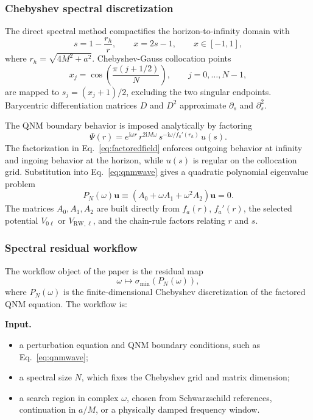 ﻿\documentclass[12pt,a4paper]{article}
\newcommand{\ii}{\mathrm{i}}
\begin{document}
\subsubsection{Chebyshev spectral discretization}

The direct spectral method compactifies the horizon-to-infinity domain with
\begin{equation*}
s=1-\frac{r_h}{r},\qquad x=2s-1,\qquad x\in[-1,1],
\end{equation*}
where \(r_h=\sqrt{4M^2+a^2}\). Chebyshev-Gauss collocation points
\begin{equation*}
x_j=\cos\left(\frac{\pi(j+1/2)}{N}\right),\qquad j=0,\ldots,N-1,
\end{equation*}
are mapped to \(s_j=(x_j+1)/2\), excluding the two singular endpoints. Barycentric differentiation matrices \(D\) and \(D^2\) approximate \(\partial_s\) and \(\partial_s^2\).

The QNM boundary behavior is imposed analytically by factoring
\begin{equation}
\Psi(r)=
e^{\ii\omega r}\,
r^{2\ii M\omega}\,
s^{-\ii\omega/f_a'(r_h)}\,u(s).
\label{eq:factoredfield}
\end{equation}
The factorization in Eq.~\eqref{eq:factoredfield} enforces outgoing behavior at infinity and ingoing behavior at the horizon, while \(u(s)\) is regular on the collocation grid. Substitution into Eq.~\eqref{eq:qnmwave} gives a quadratic polynomial eigenvalue problem
\begin{equation}
P_N(\omega)\bm{u}
\equiv
\left(A_0+\omega A_1+\omega^2A_2\right)\bm{u}=0.
\label{eq:polynomialproblem}
\end{equation}
The matrices \(A_0,A_1,A_2\) are built directly from \(f_a(r)\), \(f_a'(r)\), the selected potential \(V_{0\ell}\) or \(V_{\mathrm{RW},\ell}\), and the chain-rule factors relating \(r\) and \(s\).

\subsubsection{Spectral residual workflow}

The workflow object of the paper is the residual map
\begin{equation*}
\omega \mapsto \sigma_{\min}\!\left(P_N(\omega)\right),
\end{equation*}
where \(P_N(\omega)\) is the finite-dimensional Chebyshev discretization of the factored QNM equation. The workflow is:

\textbf{Input.}
\begin{itemize}
\item a perturbation equation and QNM boundary conditions, such as Eq.~\eqref{eq:qnmwave};
\item a spectral size \(N\), which fixes the Chebyshev grid and matrix dimension;
\item a search region in complex \(\omega\), chosen from Schwarzschild references, continuation in \(a/M\), or a physically damped frequency window.
\end{itemize}
\end{document}
